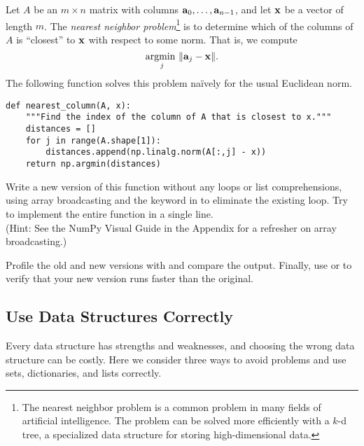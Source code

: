 \begin{problem} %
Let $A$ be an $m\times n$ matrix with columns $\mathbf{a}_0, \ldots, \mathbf{a}_{n-1}$, and let $\mathbf{x}$ be a vector of length $m$.
The \emph{nearest neighbor problem}\footnote{The nearest neighbor problem is a common problem in many fields of artificial intelligence. The problem can be solved more efficiently with a $k$-d tree, a specialized data structure for storing high-dimensional data.} is to determine which of the columns of $A$ is ``closest'' to $\mathbf{x}$ with respect to some norm.
That is, we compute
\[\underset{j}{\text{argmin }} \|\mathbf{a}_j - \mathbf{x}\|.\]
The following function solves this problem na\"ively for the usual Euclidean norm.
\begin{lstlisting}
def nearest_column(A, x):
    """Find the index of the column of A that is closest to x."""
    distances = []
    for j in range(A.shape[1]):
        distances.append(np.linalg.norm(A[:,j] - x))
    return np.argmin(distances)
\end{lstlisting}

Write a new version of this function without any loops or list comprehensions, using array broadcasting and the  keyword in  to eliminate the existing loop.
Try to implement the entire function in a single line.
\\(Hint: See the NumPy Visual Guide in the Appendix for a refresher on array broadcasting.)

Profile the old and new versions with  and compare the output.
Finally, use  or  to verify that your new version runs faster than the original.
\end{problem}

\subsection*{Use Data Structures Correctly} %

Every data structure has strengths and weaknesses, and choosing the wrong data structure can be costly.
Here we consider three ways to avoid problems and use sets, dictionaries, and lists correctly.

